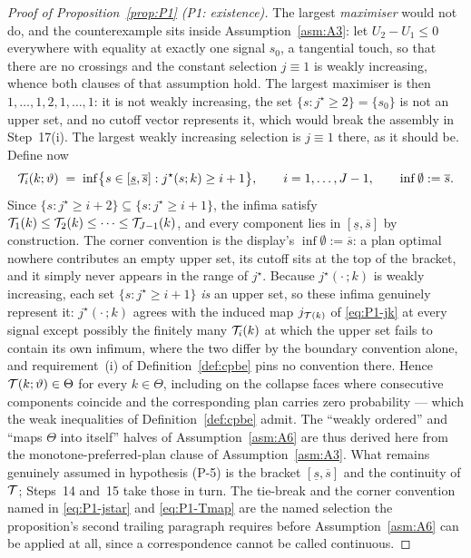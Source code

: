 \begin{proof}[Proof of Proposition~\ref{prop:P1} (P1: existence)]
The largest \emph{maximiser} would not do, and the counterexample sits inside
Assumption~\ref{asm:A3}: let $U_2-U_1 \le 0$ everywhere with equality at exactly one signal $s_0$, a
tangential touch, so that there are no crossings and the constant selection $j \equiv 1$ is weakly
increasing, whence both clauses of that assumption hold. The largest maximiser is then $1,\dots,1,
2,1,\dots,1$: it is not weakly increasing, the set $\{s : j^\star \ge 2\} = \{s_0\}$ is not an upper
set, and no cutoff vector represents it, which would break the assembly in Step~17(i). The largest
weakly increasing selection is $j \equiv 1$ there, as it should be. Define now
\begin{equation}
\label{eq:P1-Tmap}
\mathcal{T}_i(k;\vartheta) \;=\; \inf\bigl\{s \in [\underline s,\overline s] :
j^\star(s;k) \ge i+1\bigr\},
\qquad i = 1,\dots,J-1,
\qquad \inf\emptyset := \overline s .
\end{equation}
Since $\{s : j^\star \ge i+2\} \subseteq \{s : j^\star \ge i+1\}$, the infima satisfy
$\mathcal{T}_1(k) \le \mathcal{T}_2(k) \le \dots \le \mathcal{T}_{J-1}(k)$, and every component lies in
$[\underline s,\overline s]$ by construction. The corner convention is the display's
$\inf\emptyset := \overline s$: a plan optimal nowhere contributes an empty upper set, its cutoff
sits at the top of the bracket, and it simply never appears in the range of $j^\star$. Because
$j^\star(\cdot\,;k)$ is weakly increasing, each set $\{s : j^\star \ge i+1\}$ \emph{is} an upper set,
so these infima genuinely represent it: $j^\star(\cdot\,;k)$ agrees with the induced map
$j_{\mathcal{T}(k)}$ of \eqref{eq:P1-jk} at every signal except possibly the finitely many $\mathcal{T}_i(k)$ at
which the upper set fails to contain its own infimum, where the two differ by the boundary convention
alone, and requirement~(i) of Definition~\ref{def:cpbe} pins no convention there. Hence
$\mathcal{T}(k;\vartheta) \in \Theta$ for every $k \in \Theta$, including on the collapse faces where
consecutive components coincide and the corresponding plan carries zero probability --- which the
weak inequalities of Definition~\ref{def:cpbe} admit. The ``weakly ordered'' and ``maps $\Theta$ into
itself'' halves of Assumption~\ref{asm:A6} are thus derived here from the monotone-preferred-plan
clause of Assumption~\ref{asm:A3}. What remains genuinely assumed in hypothesis (P-5) is the bracket
$[\underline s,\overline s]$ and the continuity of $\mathcal{T}$; Steps~14 and~15 take those in turn. The
tie-break and the corner convention named in \eqref{eq:P1-jstar} and \eqref{eq:P1-Tmap} are the named
selection the proposition's second trailing paragraph requires before
Assumption~\ref{asm:A6} can be applied at all, since a correspondence cannot be called continuous.


\end{proof}
